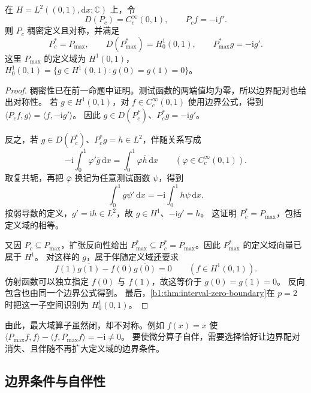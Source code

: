 \begin{proposition}[测试函数域的伴随]
\label{b1:prop:29-minimal-adjoint}
在 \(H=L^2((0,1),\mathrm dx;\mathbb C)\) 上，令
\[
 D(P_c)=C_c^\infty(0,1),\qquad P_cf=-\mathrm if'.
\]
则 \(P_c\) 稠密定义且对称，并满足
\[
 P_c^*=P_{\max},\qquad
 D(P_{\max}^*)=H_0^1(0,1),\qquad P_{\max}^*g=-\mathrm ig'.
\]
这里 \(P_{\max}\) 的定义域为 \(H^1(0,1)\)，
\(H_0^1(0,1)=\{g\in H^1(0,1):g(0)=g(1)=0\}\)。
\end{proposition}
\begin{proof}
稠密性已在前一命题中证明。测试函数的两端值均为零，所以边界配对也给出对称性。
若 \(g\in H^1(0,1)\)，对 \(f\in C_c^\infty(0,1)\) 使用边界公式，得到
\(\langle P_cf,g\rangle=\langle f,-\mathrm ig'\rangle\)。
因此 \(g\in D(P_c^*)\)、\(P_c^*g=-\mathrm ig'\)。

反之，若 \(g\in D(P_c^*)\)、\(P_c^*g=h\in L^2\)，伴随关系写成
\[
 -\mathrm i\int_0^1\varphi'\overline g\,\mathrm dx
 =\int_0^1\varphi\overline h\,\mathrm dx
 \qquad(\varphi\in C_c^\infty(0,1)).
\]
取复共轭，再把 \(\overline\varphi\) 换记为任意测试函数 \(\psi\)，得到
\[
 \int_0^1g\psi'\,\mathrm dx=-\mathrm i\int_0^1h\psi\,\mathrm dx.
\]
按弱导数的定义，\(g'=\mathrm ih\in L^2\)，故 \(g\in H^1\)、\(-\mathrm ig'=h\)。
这证明 \(P_c^*=P_{\max}\)，包括定义域的相等。

又因 \(P_c\subseteq P_{\max}\)，扩张反向性给出
\(P_{\max}^*\subseteq P_c^*=P_{\max}\)。因此 \(P_{\max}^*\) 的定义域向量已属于 \(H^1\)。
对这样的 \(g\)，属于伴随定义域还要求
\[
 f(1)\overline{g(1)}-f(0)\overline{g(0)}=0
 \qquad(f\in H^1(0,1)).
\]
仿射函数可以独立指定 \(f(0)\) 与 \(f(1)\)，故这等价于 \(g(0)=g(1)=0\)。
反向包含也由同一个边界公式得到。
最后，\cref{b1:thm:interval-zero-boundary}在 \(p=2\) 时把这一子空间识别为 \(H_0^1(0,1)\)。
\end{proof}

由此，最大域算子虽然闭，却不对称。例如 \(f(x)=x\) 使
\(\langle P_{\max}f,f\rangle-\langle f,P_{\max}f\rangle=-\mathrm i\ne0\)。
要使微分算子自伴，需要选择恰好让边界配对消失、且伴随不再扩大定义域的边界条件。

\subsection{边界条件与自伴性}
\label{b1:subsec:290703}


